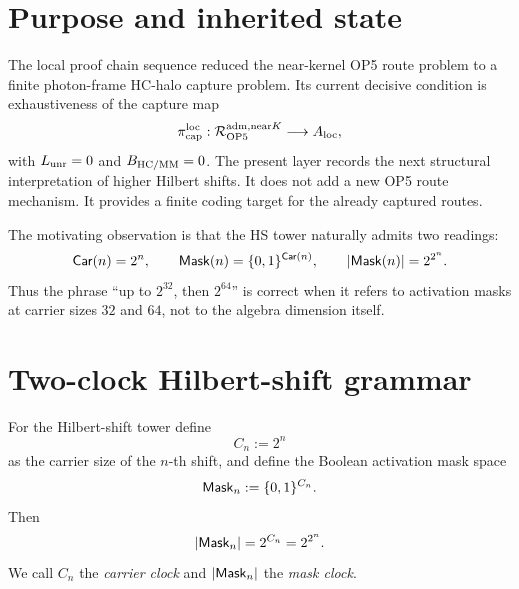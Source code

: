 \begin{abstract}
This delta layer executes the HS(6) Dixon-coding map suggested after the capture/completeness packet. The layer separates two clocks which must not be conflated: the carrier clock
\(C_n=2^n\), and the activation-mask clock \(|\{0,1\}^{C_n}|=2^{C_n}\). In this grammar, HS(5) has a 32-channel carrier with a \(2^{32}\)-state activation mask, while HS(6) has a 64-channel carrier whose activation mask has \(2^{64}\) states. The 64-channel carrier is mapped to the Dixon carrier \(D=\mathbb C\otimes\mathbb H\otimes\mathbb O\). The layer then relates the HS(4) meta-septum projector \(\widehat P_{C_7}\subset\mathcal M_{16}\), the HS(5) two-sided duplication, and the HS(6) Dixon carrier to the OP5 halo/capture chain. No claim is made that the Dixon algebra is \(2^{64}\)-dimensional; only its Boolean activation code has \(2^{64}\) possible masks.
\end{abstract}

\section{Purpose and inherited state}

The local proof chain sequence reduced the near-kernel OP5 route problem to a finite photon-frame HC-halo capture problem. Its current decisive condition is exhaustiveness of the capture map
\[
\pi_{\mathrm{cap}}^{\mathrm{loc}}:\mathcal R_{\mathrm{OP} 5}^{\mathrm{adm},\mathrm{near} K}\longrightarrow A_{\mathrm{loc}},
\]
with \(L_{\mathrm{unr}}=0\) and \(B_{\mathrm{HC}/\mathrm{MM}}=0\). The present layer records the next structural interpretation of higher Hilbert shifts. It does not add a new OP5 route mechanism. It provides a finite coding target for the already captured routes.

The motivating observation is that the HS tower naturally admits two readings:
\[
\mathsf{Car}(n)=2^n,
\qquad
\mathsf{Mask}(n)=\{0,1\}^{\mathsf{Car}(n)},
\qquad
|\mathsf{Mask}(n)|=2^{2^n}.
\]
Thus the phrase ``up to \(2^{32}\), then \(2^{64}\)'' is correct when it refers to activation masks at carrier sizes \(32\) and \(64\), not to the algebra dimension itself.

\section{Two-clock Hilbert-shift grammar}

\begin{definition}
For the Hilbert-shift tower define
\[
C_n:=2^n
\]
as the carrier size of the \(n\)-th shift, and define the Boolean activation mask space
\[
\mathsf{Mask}_n:=\{0,1\}^{C_n}.
\]
Then
\[
|\mathsf{Mask}_n|=2^{C_n}=2^{2^n}.
\]
We call \(C_n\) the \emph{carrier clock} and \(|\mathsf{Mask}_n|\) the \emph{mask clock}.
\end{definition}

